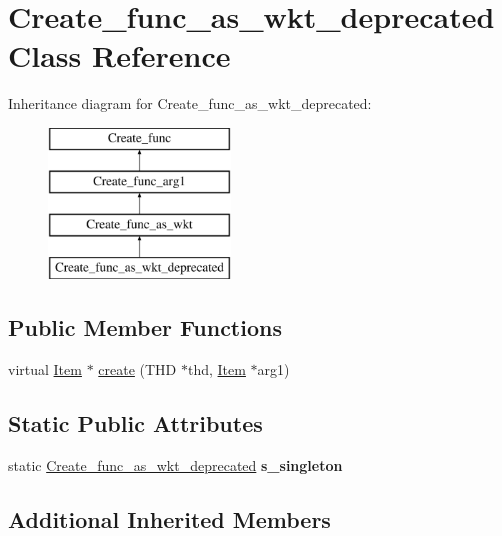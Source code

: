 \hypertarget{classCreate__func__as__wkt__deprecated}{}\section{Create\+\_\+func\+\_\+as\+\_\+wkt\+\_\+deprecated Class Reference}
\label{classCreate__func__as__wkt__deprecated}
Inheritance diagram for Create\+\_\+func\+\_\+as\+\_\+wkt\+\_\+deprecated\+:\begin{figure}[H]
\begin{center}
\leavevmode
\includegraphics[height=4.000000cm]{classCreate__func__as__wkt__deprecated}
\end{center}
\end{figure}
\subsection*{Public Member Functions}
\begin{DoxyCompactItemize}
\item 
virtual \mbox{\hyperlink{classItem}{Item}} $\ast$ \mbox{\hyperlink{classCreate__func__as__wkt__deprecated_af3531afc26f4a9256096adc2291d497c}{create}} (T\+HD $\ast$thd, \mbox{\hyperlink{classItem}{Item}} $\ast$arg1)
\end{DoxyCompactItemize}
\subsection*{Static Public Attributes}
\begin{DoxyCompactItemize}
\item 
\mbox{\label{classCreate__func__as__wkt__deprecated_abc0cbea51793b3e4bd20096e22c18264}} 
static \mbox{\hyperlink{classCreate__func__as__wkt__deprecated}{Create\+\_\+func\+\_\+as\+\_\+wkt\+\_\+deprecated}} {\bfseries s\+\_\+singleton}
\end{DoxyCompactItemize}
\subsection*{Additional Inherited Members}


